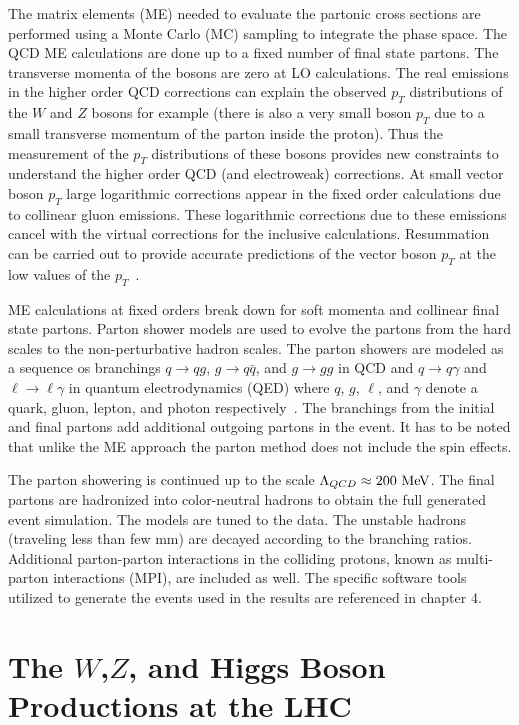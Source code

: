 The matrix elements (ME) needed to evaluate the partonic cross sections are performed using a Monte Carlo (MC) sampling to integrate the phase space. The QCD ME calculations are done up to a fixed number of final state partons. The transverse momenta of the bosons are zero at LO calculations. The real emissions in the higher order QCD corrections can explain the observed $p_{T}$ distributions of the $W$ and $Z$ bosons for example (there is also a very small boson $p_{T}$ due to a small transverse momentum of the parton inside the proton). Thus the measurement of the $p_{T}$ distributions of these bosons provides new constraints to understand the higher order QCD (and electroweak) corrections. At small vector boson $p_{T}$ large logarithmic corrections appear in the fixed order calculations due to collinear gluon emissions. These logarithmic corrections due to these emissions cancel with the virtual corrections for the inclusive calculations. Resummation can be carried out to provide accurate predictions of the vector boson $p_{T}$ at the low values of the $p_T$~\cite{Laenen:1991af}.

ME calculations at fixed orders break down for soft momenta and collinear final state partons. Parton shower models are used to evolve the partons from the hard scales to the non-perturbative hadron scales. The parton showers are modeled as a sequence os branchings $q \rightarrow qg$, $g \rightarrow q\bar{q}$, and $g \rightarrow g g$ in QCD and $q \rightarrow q\gamma$ and $\ell \rightarrow \ell \gamma$ in quantum electrodynamics (QED) where $q$, $g$, $\ell$, and $\gamma$ denote a quark, gluon, lepton, and photon respectively~\cite{Schott:2014sea}. The branchings from the initial and final partons add additional outgoing partons in the event. It has to be noted that unlike the ME approach the parton method does not include the spin effects. 

The parton showering is continued up to the scale $\Lambda_{QCD} \approx 200~\mathrm{Me\kern -0.1em V}$. The final partons are hadronized into color-neutral hadrons to obtain the full generated event simulation. The models are tuned to the data. The unstable hadrons (traveling less than few mm) are decayed according to the branching ratios. Additional parton-parton interactions in the colliding protons, known as multi-parton interactions (MPI), are included as well. The specific software tools utilized to generate the events used in the results are referenced in chapter $4$.  

\section{The $W$,$Z$, and Higgs Boson Productions at the LHC}

